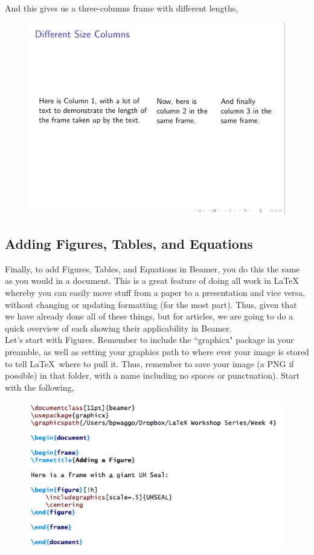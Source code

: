 \documentclass[11pt]{article}
\newcommand{\forceindent}{\leavevmode{\parindent=1.5em\indent}} %
\begin{document}
And this gives us a three-columns frame with different lengths, 

\begin{figure}[!h]
	\includegraphics[scale=.5]{OUT8}
	\centering
\end{figure}

\subsection{Adding Figures, Tables, and Equations}

\forceindent Finally, to add Figures, Tables, and Equations in Beamer, you do this the same as you would in a document. This is a great feature of doing all work in \LaTeX\, whereby you can easily move stuff from a paper to a presentation and vice versa, without changing or updating formatting (for the most part). Thus, given that we have already done all of these things, but for articles, we are going to do a quick overview of each showing their applicability in Beamer. \\

Let's start with Figures. Remember to include the ``graphicx" package in your preamble, as well as setting your graphics path to where ever your image is stored to tell \LaTeX\ where to pull it. Thus, remember to save your image (a PNG if possible) in that folder, with a name including no spaces or punctuation). Start with the following,

\begin{figure}[!h]
	\includegraphics[scale=.6]{CODE9}
	\centering
\end{figure}
\end{document}
